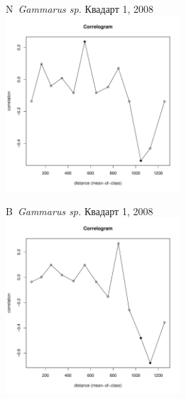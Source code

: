 \documentclass[12pt, a4paper]{disser}
\begin{document}
\begin{figure}[h]
	\begin{minipage}[b]{.46\linewidth}
	\begin{center}
	{\small N~{\it Gammarus sp.} Квадарт 1, 2008}
		\includegraphics[width=65mm]{../Barenc_Sea/distribution_Moran/Plyazh081_moran_N_Gammarus_sp_.pdf}
	\end{center}
	\end{minipage}
%
	\hfil %
%
	\begin{minipage}[b]{.46\linewidth}
	\begin{center}
	{\small B~{\it Gammarus sp.} Квадарт 1, 2008}
		\includegraphics[width=65mm]{../Barenc_Sea/distribution_Moran/Plyazh081_moran_B_Gammarus_sp_.pdf}
	\end{center}
	\end{minipage}



\end{figure}
\end{document}
